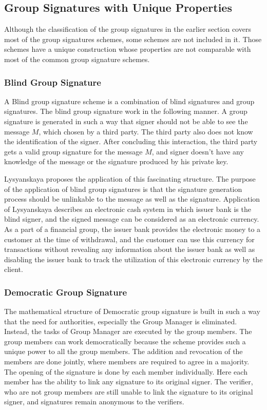 \subsection{Group Signatures with Unique Properties}\label{subsection:GSUniqueProperties}
Although the classification of the group signatures in the earlier section covers most of the group signatures schemes, some schemes are not included in it. Those schemes have a unique construction whose properties are not comparable with most of the common group signature schemes.
\subsubsection{Blind Group Signature}
A Blind group signature scheme is a combination of blind signatures and group signatures. The blind group signature work in the following manner. A group signature is generated in such a way that signer should not be able to see the message $M$, which chosen by a third party. The third party also does not know the identification of the signer. After concluding this interaction, the third party gets a valid group signature for the message $M$, and signer doesn't have any knowledge of the message or the signature produced by his private key.

Lysyanskaya proposes the application of this fascinating structure\cite{lysyanskaya1998group}. The purpose of the application of blind group signatures is that the signature generation process should be unlinkable to the message as well as the signature. Application of Lysyanskaya describes an electronic cash system in which issuer bank is the blind signer, and the signed message can be considered as an electronic currency. As a part of a financial group, the issuer bank provides the electronic money to a customer at the time of withdrawal, and the customer can use this currency for transactions without revealing any information about the issuer bank as well as disabling the issuer bank to track the utilization of this electronic currency by the client.

\subsubsection{Democratic Group Signature}
The mathematical structure of Democratic group signature is built in such a way that the need for authorities, especially the Group Manager is eliminated\cite{manulis2006democratic}\cite{manulis2006linkable}. Instead, the tasks of Group Manager are executed by the group members. The group members can work democratically because the scheme provides such a unique power to all the group members. The addition and revocation of the members are done jointly, where members are required to agree in a majority. The opening of the signature is done by each member individually. Here each member has the ability to link any signature to its original signer. The verifier, who are not group members are still unable to link the signature to its original signer, and signatures remain anonymous to the verifiers. 

